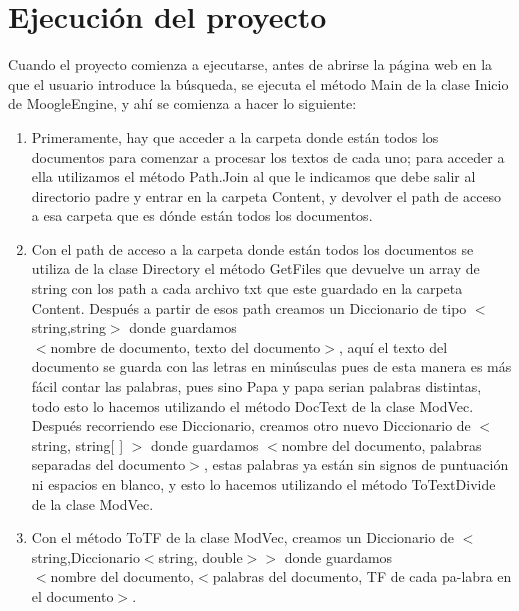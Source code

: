 \documentclass[12pt, a4paper]{article}
\begin{document}
\section{Ejecución del proyecto}

Cuando el proyecto comienza a ejecutarse, antes de abrirse la página web
en la que el usuario introduce la búsqueda, se ejecuta el método Main
de la clase Inicio de MoogleEngine, y ahí se comienza a hacer lo siguiente:

\begin{enumerate}
      \item Primeramente, hay que acceder a la carpeta donde están todos los documentos
            para comenzar a procesar los textos de cada uno; para acceder a ella
            utilizamos el método Path.Join al que le indicamos que debe salir al directorio
            padre y entrar en la carpeta Content, y devolver el path de acceso a esa carpeta
            que es dónde están todos los documentos.
      \item Con el path de acceso a la carpeta donde están todos los documentos
            se utiliza de la clase Directory el método GetFiles que devuelve
            un array de string con los path a cada archivo txt que este guardado
            en la carpeta Content. Después a partir de esos path creamos un
            Diccionario de tipo $<$string,string$>$ donde guardamos\\
            $<$nombre de documento, texto del documento$>$, aquí el texto del documento
            se guarda con las letras en minúsculas pues de esta manera es más fácil
            contar las palabras, pues sino Papa y papa serian palabras distintas,
            todo esto lo hacemos utilizando el método DocText de la clase ModVec.
            Después recorriendo ese Diccionario, creamos otro nuevo Diccionario de
            $<$string, string[ ] $>$ donde guardamos
            $<$nombre del documento, palabras separadas del documento$>$,
            estas palabras ya están sin signos de puntuación ni espacios en blanco,
            y esto lo hacemos utilizando el método ToTextDivide de la clase ModVec.
      \item Con el método ToTF de la clase ModVec, creamos un Diccionario de
            $<$string,Diccionario$<$string, double$>$$>$ donde guardamos\\
            $<$nombre del documento,$<$palabras del documento, TF de cada pa-labra en el documento$>$.\\


\end{enumerate}
\end{document}
